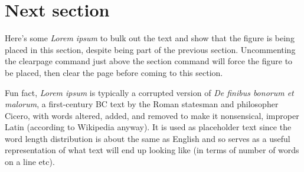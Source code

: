 \section{Next section}

Here's some \textit{Lorem ipsum} to bulk out the text and show that the figure is being placed in this section, despite being part of the previous section. Uncommenting the clearpage command just above the section command will force the figure to be placed, then clear the page before coming to this section.

Fun fact, \textit{Lorem ipsum} is typically a corrupted version of \textit{De finibus bonorum et malorum}, a first-century BC text by the Roman statesman and philosopher Cicero, with words altered, added, and removed to make it nonsensical, improper Latin (according to Wikipedia anyway). It is used as placeholder text since the word length distribution is about the same as English and so serves as a useful representation of what text will end up looking like (in terms of number of words on a line etc).

\lipsum[1-2]